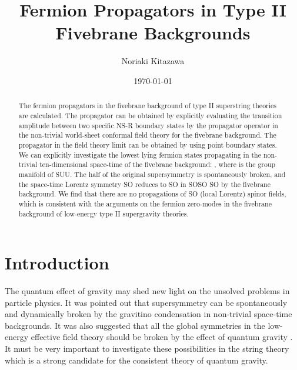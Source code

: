 \documentclass[a4paper,prd,preprint]{revtex4}
\begin{document}
\title{Fermion Propagators in Type II Fivebrane Backgrounds}

\author{Noriaki Kitazawa}

\date{\today}

\begin{abstract}
The fermion propagators in the fivebrane background
 of type II superstring theories are calculated.
The propagator can be obtained
 by explicitly evaluating the transition amplitude
 between two specific NS-R boundary states by the propagator operator
 in the non-trivial world-sheet conformal field theory
 for the fivebrane background.
The propagator in the field theory limit
 can be obtained by using point boundary states.
We can explicitly investigate
 the lowest lying fermion states
 propagating in the non-trivial ten-dimensional space-time
 of the fivebrane background:
 \coordHE{},
 where \coordHE{} is the group manifold of SU\coordHE{}U\coordHE{}.
The half of the original supersymmetry is spontaneously broken,
 and the space-time Lorentz symmetry SO\coordHE{} reduces to
 SO\coordHE{} in SO\coordHE{}SO\coordHE{} SO\coordHE{}
 by the fivebrane background.
We find that there are no propagations
 of SO\coordHE{} (local Lorentz) spinor fields,
 which is consistent with the arguments
 on the fermion zero-modes in the fivebrane background
 of low-energy type II supergravity theories.
\end{abstract}

\pacs{}
\preprint{}

\vspace*{3cm}

\maketitle

\section{Introduction}
\label{sec:intro}

The quantum effect of gravity
 may shed new light on the unsolved problems in particle physics.
It was pointed out that
 supersymmetry can be spontaneously and dynamically broken
 by the gravitino condensation\cite{Witten,KMP}
 in non-trivial space-time backgrounds.
It was also suggested that
 all the global symmetries in the low-energy effective field theory
 should be broken by the effect of quantum gravity
 \cite{Giddings-Strominger,Coleman}.
It must be very important
 to investigate these possibilities in the string theory
 which is a strong candidate for the consistent theory
 of quantum gravity.
\end{document}
